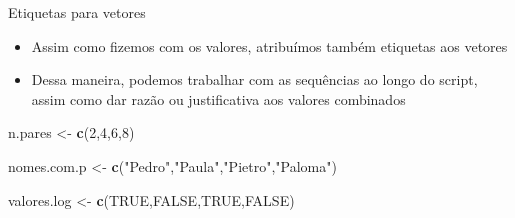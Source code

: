 \documentclass[
  10pt,
  ignorenonframetext,
]{beamer}
\newenvironment{Shaded}{\begin{snugshade}}{\end{snugshade}}
\newcommand{\DecValTok}[1]{\textcolor[rgb]{0.00,0.00,0.81}{#1}}
\newcommand{\KeywordTok}[1]{\textcolor[rgb]{0.13,0.29,0.53}{\textbf{#1}}}
\newcommand{\NormalTok}[1]{#1}
\newcommand{\OtherTok}[1]{\textcolor[rgb]{0.56,0.35,0.01}{#1}}
\newcommand{\StringTok}[1]{\textcolor[rgb]{0.31,0.60,0.02}{#1}}
\providecommand{\tightlist}{%
  \setlength{\itemsep}{0pt}\setlength{\parskip}{0pt}}
\begin{document}
\begin{frame}[fragile]{Etiquetas para vetores}
\protect\hypertarget{etiquetas-para-vetores}{}
\begin{itemize}
\tightlist
\item
  Assim como fizemos com os valores, atribuímos também etiquetas aos
  vetores
\item
  Dessa maneira, podemos trabalhar com as sequências ao longo do script,
  assim como dar razão ou justificativa aos valores combinados
\end{itemize}

\begin{Shaded}
\begin{Highlighting}[]
\NormalTok{n.pares \textless{}{-}}\StringTok{ }\KeywordTok{c}\NormalTok{(}\DecValTok{2}\NormalTok{,}\DecValTok{4}\NormalTok{,}\DecValTok{6}\NormalTok{,}\DecValTok{8}\NormalTok{)}

\NormalTok{nomes.com.p \textless{}{-}}\StringTok{ }
\KeywordTok{c}\NormalTok{(}\StringTok{"Pedro"}\NormalTok{,}\StringTok{"Paula"}\NormalTok{,}\StringTok{"Pietro"}\NormalTok{,}\StringTok{"Paloma"}\NormalTok{) }

\NormalTok{valores.log \textless{}{-}}\StringTok{ }\KeywordTok{c}\NormalTok{(}\OtherTok{TRUE}\NormalTok{,}\OtherTok{FALSE}\NormalTok{,}\OtherTok{TRUE}\NormalTok{,}\OtherTok{FALSE}\NormalTok{)}
\end{Highlighting}
\end{Shaded}
\end{frame}
\end{document}
